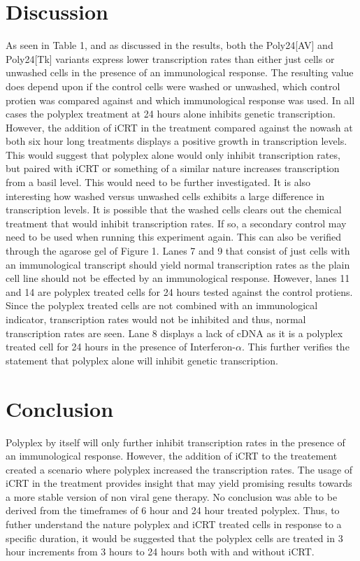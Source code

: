 \documentclass[journal, a4paper]{IEEEtran}
\begin{document}
\section{Discussion}
As seen in Table 1, and as discussed in the results, both the Poly24[AV] and Poly24[Tk] variants express lower transcription rates
than either just cells or unwashed cells in the presence of an immunological response.
The resulting value does depend upon if the control cells were washed or unwashed, which control
protien was compared against and which immunological response was used. In all cases the
polyplex treatment at 24 hours alone inhibits genetic transcription. However,
the addition of iCRT in the treatment compared against the nowash at both six hour long treatments
displays a positive growth in transcription levels. This would suggest that polyplex alone
would only inhibit transcription rates, but paired with iCRT or something of a similar nature
increases transcription from a basil level. This would need to be further investigated.
It is also interesting how washed versus unwashed cells
exhibits a large difference in transcription levels. It is possible that the washed cells
clears out the chemical treatment that would inhibit transcription rates. If so, a secondary
control may need to be used when running this experiment again.
This can also be verified through the agarose gel of Figure 1. Lanes 7 and 9
that consist of just cells with an immunological transcript should yield normal
transcription rates as the plain cell line should not be effected by an immunological response.
However, lanes 11 and 14 are polyplex treated cells for 24 hours tested against the control protiens.
Since the polyplex treated cells are not combined with an immunological indicator, transcription
rates would not be inhibited and thus, normal transcription rates are seen.
Lane 8 displays a lack of cDNA as it is a polyplex treated cell for 24 hours in the presence
of Interferon-$\alpha$. This further verifies the statement that polyplex alone will inhibit genetic transcription.

\section{Conclusion}

Polyplex by itself will only further inhibit transcription rates in the presence of an immunological response.
However, the addition of iCRT to the treatement created a scenario where polyplex increased the
transcription rates. The usage of iCRT in the treatment provides insight that may yield promising results towards
a more stable version of non viral gene therapy. No conclusion was able to be derived from the timeframes of 6 hour
and 24 hour treated polyplex. Thus, to futher understand the nature polyplex and iCRT treated cells in response to a specific duration,
it would be suggested that the polyplex cells are treated in 3 hour increments from 3 hours to 24 hours both with and without iCRT.
\end{document}
